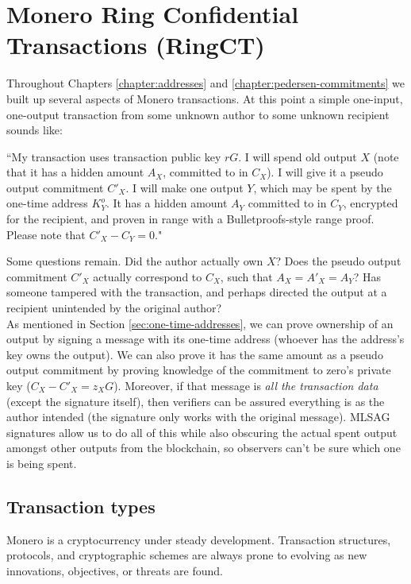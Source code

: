 \chapter{Monero Ring Confidential Transactions (RingCT)}
\label{chapter:transactions}

Throughout Chapters \ref{chapter:addresses} and \ref{chapter:pedersen-commitments} we built up several aspects of Monero transactions. At this point a simple one-input, one-output transaction from some unknown author to some unknown recipient sounds like:

``My transaction uses transaction public key $r G$. I will spend old output $X$ (note that it has a hidden amount $A_X$, committed to in $C_X$). I will give it a pseudo output commitment $C'_X$. I will make one output $Y$, which may be spent by the one-time address $K^o_Y$. It has a hidden amount $A_Y$ committed to in $C_Y$, encrypted for the recipient, and proven in range with a Bulletproofs-style range proof. Please note that $C'_X - C_Y = 0$."

Some questions remain. Did the author actually own $X$? Does the pseudo output commitment $C'_X$ actually correspond to $C_X$, such that $A_X = A'_X = A_Y$? Has someone tampered with the transaction, and perhaps directed the output at a recipient unintended by the original author?
\\

As mentioned in Section \ref{sec:one-time-addresses}, we can prove ownership of an output by signing a message with its one-time address (whoever has the address's key owns the output). We can also prove it has the same amount as a pseudo output commitment by proving knowledge of the commitment to zero's private key ($C_X - C'_X = z_X G$). Moreover, if that message is {\em all the transaction data} (except the signature itself), then verifiers can be assured everything is as the author intended (the signature only works with the original message). MLSAG signatures allow us to do all of this while also obscuring the actual spent output amongst other outputs from the blockchain, so observers can't be sure which one is being spent.



\section{Transaction types}
\label{sec:transaction_types}

Monero is a cryptocurrency under steady development. Transaction structures, protocols, and cryptographic schemes are always prone to evolving as new innovations, objectives, or threats are found.

